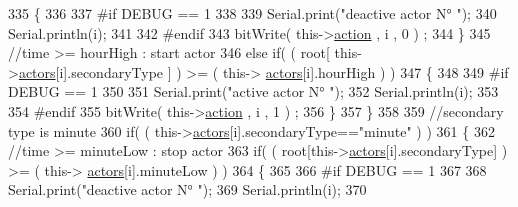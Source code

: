 \begin{DoxyCode}
335                             \{
336                         
337 \textcolor{preprocessor}{                            #if DEBUG == 1 }
338                             
339                                 Serial.print(\textcolor{stringliteral}{"deactive actor N° "});
340                                 Serial.println(i);
341                         
342 \textcolor{preprocessor}{                            #endif  }
343                                 bitWrite( this->\hyperlink{class_jetpack_aca3142925a7b0834b34ae91d26af7765}{action} , i , 0 ) ;    
344                             \}
345                             \textcolor{comment}{//time >= hourHigh : start actor}
346                             \textcolor{keywordflow}{else} \textcolor{keywordflow}{if}( ( root[ this->\hyperlink{class_jetpack_a7e16d2f97837f9712a2e6de1c50d99db}{actors}[i].secondaryType ] ) >= ( this->
      \hyperlink{class_jetpack_a7e16d2f97837f9712a2e6de1c50d99db}{actors}[i].hourHigh ) )
347                             \{
348                         
349 \textcolor{preprocessor}{                            #if DEBUG == 1 }
350                         
351                                 Serial.print(\textcolor{stringliteral}{"active actor N° "});
352                                 Serial.println(i);
353                         
354 \textcolor{preprocessor}{                            #endif}
355                                 bitWrite( this->\hyperlink{class_jetpack_aca3142925a7b0834b34ae91d26af7765}{action} , i , 1 ) ;                    
356                             \}
357                         \}
358 
359                         \textcolor{comment}{//secondary type is minute  }
360                         \textcolor{keywordflow}{if}( ( this->\hyperlink{class_jetpack_a7e16d2f97837f9712a2e6de1c50d99db}{actors}[i].secondaryType==\textcolor{stringliteral}{"minute"} ) )
361                         \{
362                             \textcolor{comment}{//time >= minuteLow : stop actor}
363                             \textcolor{keywordflow}{if}( ( root[this->\hyperlink{class_jetpack_a7e16d2f97837f9712a2e6de1c50d99db}{actors}[i].secondaryType] ) >= ( this->
      \hyperlink{class_jetpack_a7e16d2f97837f9712a2e6de1c50d99db}{actors}[i].minuteLow ) )   
364                             \{
365                         
366 \textcolor{preprocessor}{                            #if DEBUG == 1 }
367                             
368                                 Serial.print(\textcolor{stringliteral}{"deactive actor N° "});
369                                 Serial.println(i);
370                         

\end{DoxyCode}
